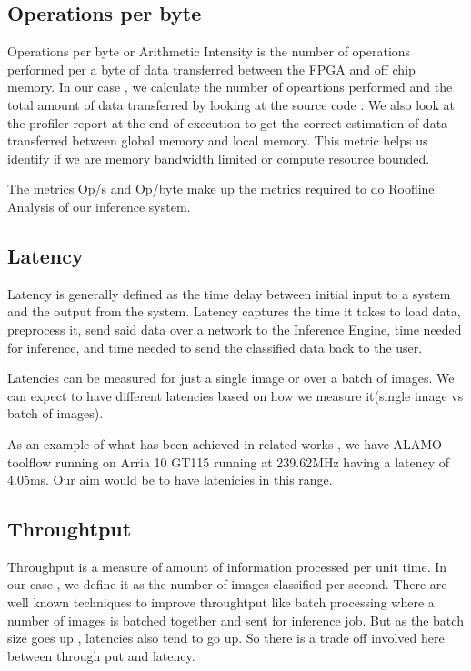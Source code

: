 \documentclass[titlepage]{report}
\begin{document}
\subsection{Operations per byte}
Operations per byte or Arithmetic Intensity is the number of operations performed per a byte of data transferred between the FPGA and off chip memory.  
In our case , we calculate the number of opeartions performed and the total amount of data transferred by looking at the source code . We also look at the profiler report at the end of execution to get the correct estimation of data transferred between global memory and local memory.  
This metric helps us identify if we are memory bandwidth limited or compute resource bounded.  

The metrics Op/s and Op/byte make up the metrics required to do Roofline Analysis of our inference system.  


\subsection{Latency}
Latency is generally defined as the time delay between initial input to a system and the output from the system. Latency captures the time it takes to load data, preprocess it, send said data over a network to the Inference Engine, time needed for inference, and time needed to send the classified data back to the user.   

Latencies can be measured for just a single image or over a batch of images. We can expect to have different latencies based on how we measure it(single image vs batch of images).  

As an example of what has been achieved in related works , we have ALAMO toolflow running on Arria 10 GT115 running at 239.62MHz having a latency of 4.05ms.
Our aim would be to have latenicies in this range.

\subsection{Throughtput}
Throughput is  a measure of amount of information processed per unit time. In our case , we define it as the number of images classified  per second.  There are well known techniques to improve throughtput like batch processing where a number of images is batched together and sent for inference job. 
But as the batch size goes up , latencies also tend to go up. So there is a trade off involved here between through put and latency.
\end{document}

